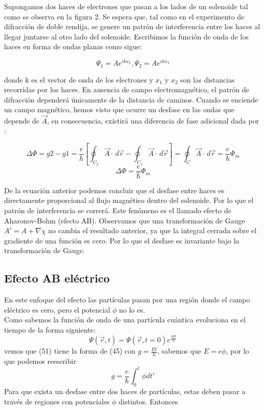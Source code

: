 \documentclass[12pt]{article}
\begin{document}
Supongamos dos haces de electrones que pasan a los lados de un solenoide tal como se observa en la figura 2. Se espera que, tal como en el experimento de difracción de doble rendija, se genere un patrón de interferencia entre los haces al llegar juntarse al otro lado del solenoide. Escribimos la función de onda de los haces en forma de ondas planas como sigue:


\begin{equation}
\Psi_1=Ae^{ikx_1}, \Psi_2=Ae^{ikx_2}
\end{equation}


donde k es el vector de onda de los electrones y $x_1$ y $x_2$ son las distancias recorridas por los haces.
En ausencia de campo electromagnético, el patrón de difracción dependerá únicamente de la distancia de caminos. Cuando se enciende un campo magnético, hemos visto que ocurre un desfase en las ondas que depende de $\vec{A}$, en consecuencia, existirá una diferencia de fase adicional dada por :

\begin{equation}
\Delta \Phi =g2-g1=\frac{e}{\hbar}[\oint_{C_2} \vec{A}\cdot \,d\vec{r}-\oint_{C_1} \vec{A}\cdot \,d\vec{r}]=\oint_{C} \vec{A}\cdot \,d\vec{r}=\frac{e}{\hbar}\Phi_m
\end{equation}
\begin{equation}
\boxed{\Delta \Phi =\frac{e}{\hbar}\Phi_m}
\end{equation}

De la ecuación anterior podemos concluir que el desfase entre haces es directamente proporcional al flujo magnético dentro del solenoide. Por lo que el patrón de interferencia se correrá. Este fenómeno es el llamado efecto de Aharonov-Bohm (efecto AB).
Observamos que una transformación de Gauge $A'=A+\nabla\chi$ no cambia el resultado anterior, ya que la integral cerrada sobre el gradiente de una función es cero. Por lo que el desfase es invariante bajo la transformación de Gauge.
 \cite{2}
\subsection{Efecto AB eléctrico}
En este enfoque del efecto las partículas pasan por una región donde el campo eléctrico es cero, pero el potencial $\phi$ no lo es. \\
Como sabemos la función de onda de una partícula cuántica evoluciona en el tiempo de la forma siguiente:
\begin{equation}
\Psi(\vec{r},t)=\Psi(\vec{r},t=0)e^{\frac{iEt}{\hbar}}
\end{equation}
vemos que (51) tiene la forma de (45) con $g=\frac{Et}{\hbar}$, sabemos que $E=e\phi$, por lo que podemos reescribir
\begin{equation}
g=\frac{e}{\hbar} \int_{0}^{t} \phi dt'
\end{equation}
Para que exista un desfase entre dos haces de partículas, estas deben pasar a través de regiones con potenciales $\phi$ distintos.
Entonces 
\end{document}
